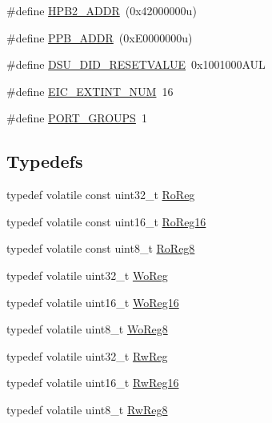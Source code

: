 \begin{DoxyCompactItemize}
\item 
\#define \mbox{\hyperlink{group___s_a_m_d21_e18_a__definitions_gaef42fa53ddf169a2a50be70d29f73571}{H\+P\+B2\+\_\+\+A\+D\+DR}}~(0x42000000u)
\item 
\#define \mbox{\hyperlink{group___s_a_m_d21_e18_a__definitions_ga8895d0a3a9a3126cc44330f86c8ce564}{P\+P\+B\+\_\+\+A\+D\+DR}}~(0x\+E0000000u)
\item 
\#define \mbox{\hyperlink{group___s_a_m_d21_e18_a__definitions_gada75131d542c9e1966238f5488f89bd6}{D\+S\+U\+\_\+\+D\+I\+D\+\_\+\+R\+E\+S\+E\+T\+V\+A\+L\+UE}}~0x1001000\+A\+UL
\item 
\#define \mbox{\hyperlink{group___s_a_m_d21_e18_a__definitions_ga88ebc38c95506296f5d21f82476296ae}{E\+I\+C\+\_\+\+E\+X\+T\+I\+N\+T\+\_\+\+N\+UM}}~16
\item 
\#define \mbox{\hyperlink{group___s_a_m_d21_e18_a__definitions_gab9243ffe03a1dc631b57a495b4b3d467}{P\+O\+R\+T\+\_\+\+G\+R\+O\+U\+PS}}~1
\end{DoxyCompactItemize}
\subsection*{Typedefs}
\begin{DoxyCompactItemize}
\item 
typedef volatile const uint32\+\_\+t \mbox{\hyperlink{group___s_a_m_d21_e18_a__definitions_ga5d556f8391af4141be23f7334ac9dd68}{Ro\+Reg}}
\item 
typedef volatile const uint16\+\_\+t \mbox{\hyperlink{group___s_a_m_d21_e18_a__definitions_gaebf6e33c2d49a802e06e22a95ea9d0d0}{Ro\+Reg16}}
\item 
typedef volatile const uint8\+\_\+t \mbox{\hyperlink{group___s_a_m_d21_e18_a__definitions_ga0d957f1433aaf5d70e4dc2b68288442d}{Ro\+Reg8}}
\item 
typedef volatile uint32\+\_\+t \mbox{\hyperlink{group___s_a_m_d21_e18_a__definitions_gac0f96d4e8018367b38f527007cf0eafd}{Wo\+Reg}}
\item 
typedef volatile uint16\+\_\+t \mbox{\hyperlink{group___s_a_m_d21_e18_a__definitions_ga0ab0e5f6c8301aa1c2068e511d854094}{Wo\+Reg16}}
\item 
typedef volatile uint8\+\_\+t \mbox{\hyperlink{group___s_a_m_d21_e18_a__definitions_ga5e336e5a36ee12ebeafb021108e5275b}{Wo\+Reg8}}
\item 
typedef volatile uint32\+\_\+t \mbox{\hyperlink{group___s_a_m_d21_e18_a__definitions_gacf1496e3bbe303e55f627fc7558a68c7}{Rw\+Reg}}
\item 
typedef volatile uint16\+\_\+t \mbox{\hyperlink{group___s_a_m_d21_e18_a__definitions_gacce07556c80fc352ae607f225f19fed5}{Rw\+Reg16}}
\item 
typedef volatile uint8\+\_\+t \mbox{\hyperlink{group___s_a_m_d21_e18_a__definitions_gae361754be775bb192f85821d3ab33c17}{Rw\+Reg8}}
\end{DoxyCompactItemize}


